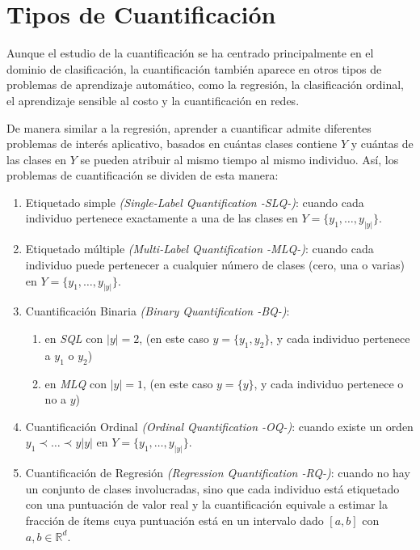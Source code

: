\section{Tipos de Cuantificación}

Aunque el estudio de la cuantificación se ha centrado principalmente en el
dominio de clasificación, la cuantificación también aparece en otros tipos de
problemas de aprendizaje automático, como la regresión, la clasificación
ordinal, el aprendizaje sensible al costo y la cuantificación en redes.

De manera similar a la regresión, aprender a cuantificar admite diferentes
problemas de interés aplicativo, basados en cuántas clases contiene $Y$ y
cuántas de las clases en $Y$ se pueden atribuir al mismo tiempo al mismo
individuo. Así, los problemas de cuantificación se dividen de esta manera:

\begin{enumerate}
    \item Etiquetado simple {\it (Single-Label Quantification -SLQ-)\/}: cuando
    cada individuo pertenece exactamente a una de las clases en
    $Y=\{y_1,\dots,y_{|y|}\}$.
    \item Etiquetado múltiple {\it (Multi-Label Quantification -MLQ-)\/}: cuando
    cada individuo puede pertenecer a cualquier número de clases (cero, una o
    varias) en $Y=\{y_1,\dots,y_{|y|}\}$.
    \item Cuantificación Binaria {\it (Binary Quantification -BQ-)\/}:
    \begin{enumerate}
        \item en {\it SQL\/} con $|y|=2$, (en este caso $y=\{y_1,y_2\}$, y cada
        individuo pertenece a $y_1$ o $y_2$)
        \item en {\it MLQ\/} con $|y|=1$, (en este caso $y=\{y\}$, y cada
        individuo pertenece o no a $y$)
    \end{enumerate}
    \item Cuantificación Ordinal {\it (Ordinal Quantification -OQ-)\/}: cuando
    existe un orden $y_1 \prec \dots \prec y|y|$ en $Y=\{y_1,\dots,y_{|y|}\}$.
    \item Cuantificación de Regresión {\it (Regression Quantification -RQ-)\/}:
    cuando no hay un conjunto de clases involucradas, sino que cada individuo
    está etiquetado con una puntuación de valor real y la cuantificación
    equivale a estimar la fracción de ítems cuya puntuación está en un intervalo
    dado $[a, b]$ con ${a, b \in \mathbb{R}^d}$.
\end{enumerate}

